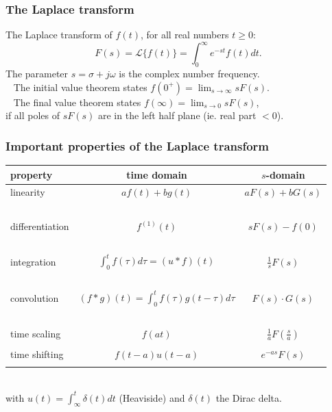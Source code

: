\begin{frame}
\frametitle{The Laplace transform}
The Laplace transform of $f(t)$, for all real numbers $t\geq 0$:
\begin{equation*}
F(s) = \mathcal{L}\big\{f(t)\big\} = \int_0^\infty e^{-st} f(t) dt.
\end{equation*}
\pause
The parameter $s = \sigma + j\omega$ is the complex number frequency.\\ \pause
\ \newline
The initial value theorem states $f(0^+) = \lim_{s\rightarrow\infty} sF(s)$. \\
\pause
\ \newline
The final value theorem states $f(\infty) = \lim_{s\rightarrow0} sF(s)$, \\
if all poles of $sF(s)$ are in the left half plane (ie. real part $<0$).
\end{frame}

\begin{frame}
\frametitle{Important properties of the Laplace transform}
\centering
\begin{tabular}{lcc}
\textbf{property}	& \textbf{time domain}	& \textbf{$s$-domain} \\
\midrule
linearity	& $af(t)+bg(t)$ & $aF(s) + bG(s)$ \\ \pause
\ \\
differentiation	& $f^{(1)}(t)$	& $s F(s) - f(0)$ \\ \pause
\ \\
integration	& $\int_0^t f(\tau)d\tau = (u*f)(t)$	&	$\frac{1}{s}F(s)$ \\ \pause
\ \\
convolution	& $(f * g)(t)=\int_0^t f(\tau)g(t-\tau)d\tau$	& $F(s)\cdot G(s)$ \\ \pause
\ \\
time scaling	& $f(at)$	& $\frac{1}{a}F(\frac{s}{a})$ \\ \pause
\\
time shifting	& $f(t-a)u(t-a)$	& $e^{-as} F(s)$ \\ \pause
\end{tabular} \\
with $u(t)=\int_\infty^t \delta(t)dt$ (Heaviside) and $\delta(t)$ the Dirac delta.
\end{frame}


